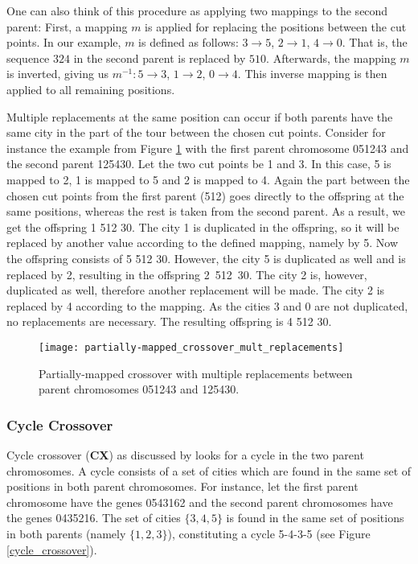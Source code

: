 One can also think of this procedure as applying two mappings to the second parent: First, a mapping $m$ is applied for replacing the positions between the cut points. In our example, $m$ is defined as follows: $3 \rightarrow 5$, $2 \rightarrow 1$, $4 \rightarrow 0$. That is, the sequence $324$ in the second parent is replaced by $510$. Afterwards, the mapping $m$ is inverted, giving us $m^{-1}: 5 \rightarrow 3$, $1 \rightarrow 2$, $0 \rightarrow 4$. This inverse mapping is then applied to all remaining positions.\par

Multiple replacements at the same position can occur if both parents have the same city in the part of the tour between the chosen cut points. Consider for instance the example from Figure \ref{partially-mapped_crossover_mult_replacements} with the first parent chromosome 051243 and the second parent 125430. Let the two cut points be 1 and 3.  In this case, 5 is mapped to 2, 1 is mapped to 5 and 2 is mapped to 4. Again the part between the chosen cut points from the first parent (512) goes directly to the offspring at the same positions, whereas the rest is taken from the second parent. As a result, we get the offspring 1 512 30. The city 1 is duplicated in the offspring, so it will be replaced by another value according to the defined mapping, namely by 5. Now the offspring consists of 5 512 30. However, the city 5 is duplicated as well and is replaced by 2, resulting in the offspring \mbox{2 512 30}. The city 2 is, however, duplicated as well, therefore another replacement will be made. The city 2 is replaced by 4 according to the mapping. As the cities 3 and 0 are not duplicated, no replacements are necessary. The resulting offspring is 4 512 30. 

\begin{figure}[htp] \centering
	\centering
	\texttt{[image: partially-mapped\_crossover\_mult\_replacements]}
	\caption{Partially-mapped crossover with multiple replacements between parent chromosomes 051243 and 125430.}
	\label{partially-mapped_crossover_mult_replacements}
\end{figure}

\subsubsection{Cycle Crossover} 
\label{subsubsec:cycle}

Cycle crossover (\textbf{CX}) as discussed by \citeauthor{potvin1996genetic} \cite{potvin1996genetic} looks for a cycle in the two parent chromosomes. A cycle consists of a set of cities which are found in the same set of positions in both parent chromosomes. For instance, let the first parent chromosome have the genes 0543162 and the second parent chromosomes have the genes 0435216. The set of cities $\{3,4,5\}$ is found in the same set of positions in both parents (namely $\{1,2,3\}$), constituting a cycle 5-4-3-5 (see Figure \ref{cycle_crossover}). 

